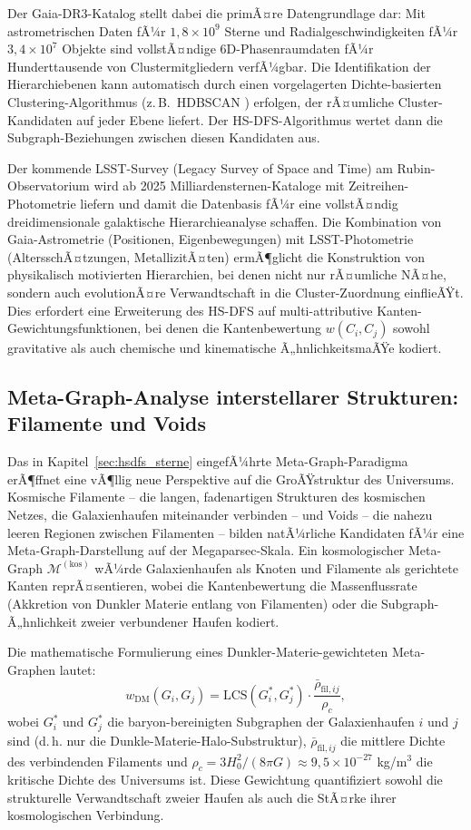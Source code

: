 ﻿\documentclass[a4paper,12pt]{report}
\theoremstyle{definition}
\begin{document}
Der Gaia-DR3-Katalog \cite{gaia2022} stellt dabei die primÃ¤re Datengrundlage dar: Mit astrometrischen Daten fÃ¼r $1{,}8 \times 10^9$ Sterne und Radialgeschwindigkeiten fÃ¼r $3{,}4 \times 10^7$ Objekte sind vollstÃ¤ndige 6D-Phasenraumdaten fÃ¼r Hunderttausende von Clustermitgliedern verfÃ¼gbar. Die Identifikation der Hierarchiebenen kann automatisch durch einen vorgelagerten Dichte-basierten Clustering-Algorithmus (z.\,B.\ HDBSCAN \cite{campello2013}) erfolgen, der rÃ¤umliche Cluster-Kandidaten auf jeder Ebene liefert. Der HS-DFS-Algorithmus wertet dann die Subgraph-Beziehungen zwischen diesen Kandidaten aus.

Der kommende LSST-Survey (Legacy Survey of Space and Time) am Rubin-Observato\-rium wird ab 2025 Milliardensternen-Kataloge mit Zeitreihen-Photometrie liefern und damit die Datenbasis fÃ¼r eine vollstÃ¤ndig dreidimensionale galaktische Hierarchieanalyse schaffen. Die Kombination von Gaia-Astrometrie (Positionen, Eigenbewegungen) mit LSST-Photometrie (AltersschÃ¤tzungen, MetallizitÃ¤ten) ermÃ¶glicht die Konstruktion von physikalisch motivierten Hierarchien, bei denen nicht nur rÃ¤umliche NÃ¤he, sondern auch evolutionÃ¤re Verwandtschaft in die Cluster-Zuordnung einflieÃŸt. Dies erfordert eine Erweiterung des HS-DFS auf multi-attributive Kanten-Gewichtungsfunktionen, bei denen die Kantenbewertung $w(C_i, C_j)$ sowohl gravitative als auch chemische und kinematische Ã„hnlichkeitsmaÃŸe kodiert.

\subsection{Meta-Graph-Analyse interstellarer Strukturen: Filamente und Voids}

Das in Kapitel~\ref{sec:hsdfs_sterne} eingefÃ¼hrte Meta-Graph-Paradigma erÃ¶ffnet eine vÃ¶llig neue Perspektive auf die GroÃŸstruktur des Universums. Kosmische Filamente -- die langen, fadenartigen Strukturen des kosmischen Netzes, die Galaxienhaufen miteinander verbinden -- und Voids -- die nahezu leeren Regionen zwischen Filamenten -- bilden natÃ¼rliche Kandidaten fÃ¼r eine Meta-Graph-Darstellung auf der Megaparsec-Skala. Ein kosmologischer Meta-Graph $\mathcal{M}^{(\mathrm{kos})}$ wÃ¼rde Galaxienhaufen als Knoten und Filamente als gerichtete Kanten reprÃ¤sentieren, wobei die Kantenbewertung die Massenflussrate (Akkretion von Dunkler Materie entlang von Filamenten) oder die Subgraph-Ã„hnlichkeit zweier verbundener Haufen kodiert.

Die mathematische Formulierung eines Dunkler-Materie-gewichteten Meta-Graphen lautet:
\[
w_{\mathrm{DM}}(G_i, G_j) = \mathrm{LCS}(G_i^*, G_j^*) \cdot \frac{\bar{\rho}_{\mathrm{fil},ij}}{\rho_c},
\]
wobei $G_i^*$ und $G_j^*$ die baryon-bereinigten Subgraphen der Galaxienhaufen $i$ und $j$ sind (d.\,h. nur die Dunkle-Materie-Halo-Substruktur), $\bar{\rho}_{\mathrm{fil},ij}$ die mittlere Dichte des verbindenden Filaments und $\rho_c = 3H_0^2 / (8\pi G) \approx 9{,}5 \times 10^{-27}$ kg/m$^3$ die kritische Dichte des Universums ist. Diese Gewichtung quantifiziert sowohl die strukturelle Verwandtschaft zweier Haufen als auch die StÃ¤rke ihrer kosmologischen Verbindung.
\end{document}
